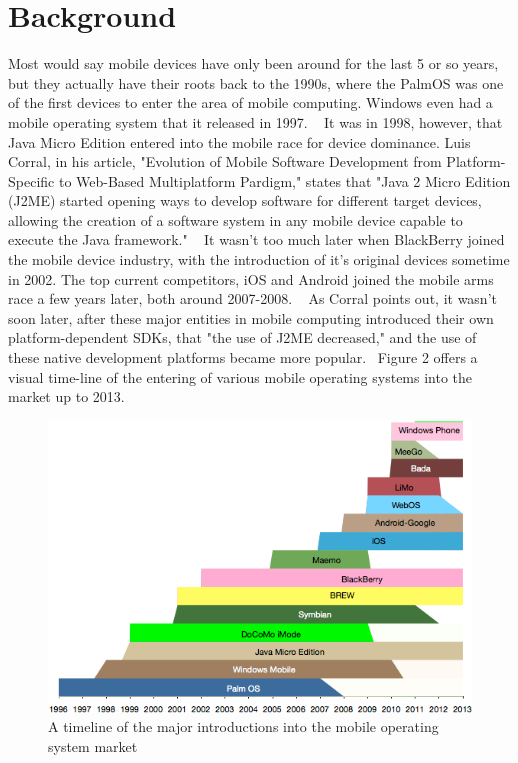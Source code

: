 \documentclass[11pt, twocolumn]{article}
\begin{document}
\section{Background}
Most would say mobile devices have only been around for the last 5 or so years, but they actually have their roots back to the 1990s, where the PalmOS was one of the first devices to enter the area of mobile computing. Windows even had a mobile operating system that it released in 1997. ~\cite{Dediu2011}  It was in 1998, however, that Java Micro Edition entered into the mobile race for device dominance.  Luis Corral, in his article, "Evolution of Mobile Software Development from Platform-Specific to Web-Based Multiplatform Pardigm," states that "Java 2 Micro Edition (J2ME) started opening ways to develop software for different target devices, allowing the creation of a software system in any mobile device capable to execute the Java framework." ~\cite{Corral2011}  It wasn't too much later when BlackBerry joined the mobile device industry, with the introduction of it's original devices sometime in 2002. The top current competitors, iOS and Android joined the mobile arms race a few years later, both around 2007-2008. ~\cite{Dediu2011}  As Corral points out, it wasn't soon later, after these major entities in mobile computing introduced their own platform-dependent SDKs, that "the use of J2ME decreased," and the use of these native development platforms became more popular.~\cite{Corral2011} Figure 2 offers a visual time-line of the entering of various mobile operating systems into the market up to 2013. \\

\begin{figure}[h!]
\includegraphics[scale=0.568]{mobile-proliferation}
\caption{A timeline of the major introductions into the mobile operating system market ~\cite{Dediu2011}}
\end{figure}
\end{document}
